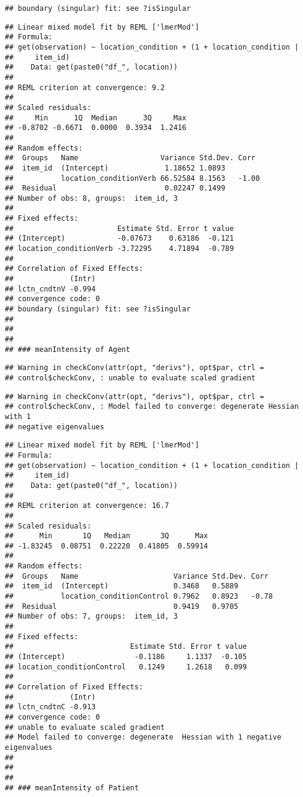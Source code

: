 \documentclass[]{article}
\begin{document}
\begin{verbatim}
## boundary (singular) fit: see ?isSingular
\end{verbatim}

\begin{verbatim}
## Linear mixed model fit by REML ['lmerMod']
## Formula: 
## get(observation) ~ location_condition + (1 + location_condition |  
##     item_id)
##    Data: get(paste0("df_", location))
## 
## REML criterion at convergence: 9.2
## 
## Scaled residuals: 
##     Min      1Q  Median      3Q     Max 
## -0.8702 -0.6671  0.0000  0.3934  1.2416 
## 
## Random effects:
##  Groups   Name                   Variance Std.Dev. Corr 
##  item_id  (Intercept)             1.18652 1.0893        
##           location_conditionVerb 66.52584 8.1563   -1.00
##  Residual                         0.02247 0.1499        
## Number of obs: 8, groups:  item_id, 3
## 
## Fixed effects:
##                        Estimate Std. Error t value
## (Intercept)            -0.07673    0.63186  -0.121
## location_conditionVerb -3.72295    4.71894  -0.789
## 
## Correlation of Fixed Effects:
##             (Intr)
## lctn_cndtnV -0.994
## convergence code: 0
## boundary (singular) fit: see ?isSingular
## 
##   
##   
## ### meanIntensity of Agent
\end{verbatim}

\begin{verbatim}
## Warning in checkConv(attr(opt, "derivs"), opt$par, ctrl =
## control$checkConv, : unable to evaluate scaled gradient
\end{verbatim}

\begin{verbatim}
## Warning in checkConv(attr(opt, "derivs"), opt$par, ctrl =
## control$checkConv, : Model failed to converge: degenerate Hessian with 1
## negative eigenvalues
\end{verbatim}

\begin{verbatim}
## Linear mixed model fit by REML ['lmerMod']
## Formula: 
## get(observation) ~ location_condition + (1 + location_condition |  
##     item_id)
##    Data: get(paste0("df_", location))
## 
## REML criterion at convergence: 16.7
## 
## Scaled residuals: 
##      Min       1Q   Median       3Q      Max 
## -1.83245  0.08751  0.22220  0.41805  0.59914 
## 
## Random effects:
##  Groups   Name                      Variance Std.Dev. Corr 
##  item_id  (Intercept)               0.3468   0.5889        
##           location_conditionControl 0.7962   0.8923   -0.78
##  Residual                           0.9419   0.9705        
## Number of obs: 7, groups:  item_id, 3
## 
## Fixed effects:
##                           Estimate Std. Error t value
## (Intercept)                -0.1186     1.1337  -0.105
## location_conditionControl   0.1249     1.2618   0.099
## 
## Correlation of Fixed Effects:
##             (Intr)
## lctn_cndtnC -0.913
## convergence code: 0
## unable to evaluate scaled gradient
## Model failed to converge: degenerate  Hessian with 1 negative eigenvalues
## 
##   
##   
## ### meanIntensity of Patient
\end{verbatim}
\end{document}
